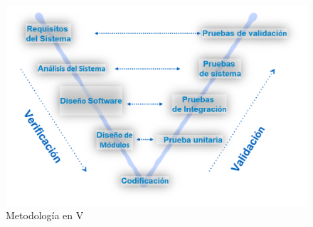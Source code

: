 \\
\begin{figure}[H]
	\centering
	\includegraphics[scale=.5]{Capitulo3/img/vmodel.png}
	\caption{Metodología en V}
	\label{fig:ModeloIncremental}
\end{figure}


